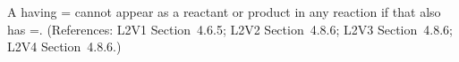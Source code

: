 A \Species having = cannot
appear as a reactant or product in any reaction if that \Species
also has =.  (References: L2V1
Section~4.6.5; L2V2 Section~4.8.6; L2V3 Section~4.8.6; L2V4 Section~4.8.6.)
